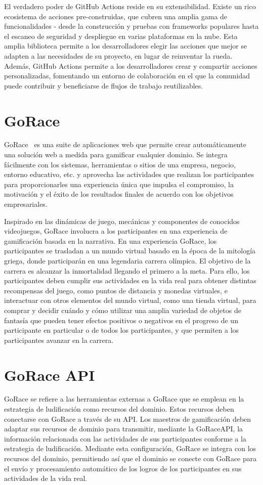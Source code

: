 El verdadero poder de GitHub Actions reside en su extensibilidad.  Existe un rico ecosistema de acciones pre-construidas, que cubren una amplia gama de funcionalidades - desde la construcción y pruebas con frameworks populares hasta el escaneo de seguridad y despliegue en varias plataformas en la nube.  Esta amplia biblioteca permite a los desarrolladores elegir las acciones que mejor se adapten a las necesidades de su proyecto, en lugar de reinventar la rueda.  Además, GitHub Actions permite a los desarrolladores crear y compartir acciones personalizadas, fomentando un entorno de colaboración en el que la comunidad puede contribuir y beneficiarse de flujos de trabajo reutilizables.

\section{GoRace}
GoRace~\cite{gorace} es una suite de aplicaciones web que permite crear automáticamente una solución web a medida para gamificar cualquier dominio. Se integra fácilmente con los sistemas, herramientas o sitios de una empresa, negocio, entorno educativo, etc. y aprovecha las actividades que realizan los participantes para proporcionarles una experiencia única que impulsa el compromiso, la motivación y el éxito de los resultados finales de acuerdo con los objetivos empresariales.

Inspirado en las dinámicas de juego, mecánicas y componentes de conocidos videojuegos, GoRace involucra a los participantes en una experiencia de gamificación basada en la narrativa. En una experiencia GoRace, los participantes se trasladan a un mundo virtual basado en la época de la mitología griega, donde participarán en una legendaria carrera olímpica. El objetivo de la carrera es alcanzar la inmortalidad llegando el primero a la meta. Para ello, los participantes deben cumplir sus actividades en la vida real para obtener distintas recompensas del juego, como puntos de distancia y monedas virtuales, e interactuar con otros elementos del mundo virtual, como una tienda virtual, para comprar y decidir cuándo y cómo utilizar una amplia variedad de objetos de fantasía que pueden tener efectos positivos o negativos en el progreso de un participante en particular o de todos los participantes, y que permiten a los participantes avanzar en la carrera.

\section{GoRace API}
GoRace se refiere a las herramientas externas a GoRace que se emplean en la estrategia de ludificación como recursos del dominio. Estos recursos deben conectarse con GoRace a través de su \acrshort{API}. Los maestros de gamificación deben adaptar sus recursos de dominio para transmitir, mediante la GoRaceAPI, la información relacionada con las actividades de sus participantes conforme a la estrategia de ludificación. Mediante esta configuración, GoRace se integra con los recursos del dominio, permitiendo así que el dominio se conecte con GoRace para el envío y procesamiento automático de los logros de los participantes en sus actividades de la vida real.
